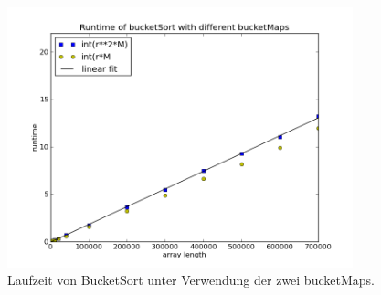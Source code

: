 \documentclass[a4paper]{article}
\begin{document}
\begin{figure}
  \centering
  \includegraphics[width=10cm]{runtime.png}
  \caption{Laufzeit von BucketSort unter Verwendung der zwei bucketMaps.}
  \label{fig:runtime}
\end{figure}
\end{document}
